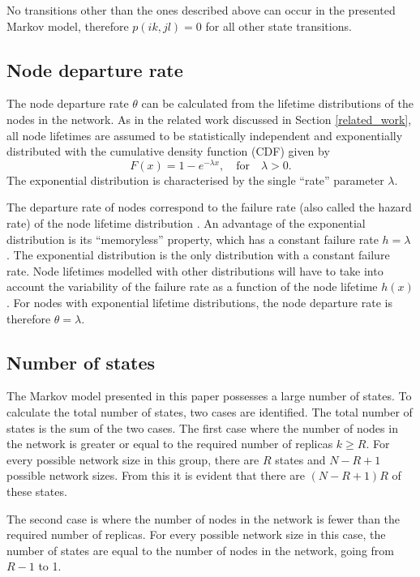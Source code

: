 \documentclass[10pt,a4paper,conference]{IEEEtran}
\begin{document}
No transitions other than the ones described above can occur in the presented Markov model, therefore $p(i k,j l) = 0$ for all other state transitions.

\subsection{Node departure rate}

The node departure rate $\theta$ can be calculated from the lifetime distributions of the nodes in the network. As in the related work discussed in Section \ref{related_work}, all node lifetimes are assumed to be statistically independent and exponentially distributed with the cumulative density function (CDF) given by
%
\begin{equation} \label{exp_dist}
    F(x) = 1 - e^{-\lambda x},\quad\textrm{for}\quad \lambda > 0.
\end{equation}
%
The exponential distribution is characterised by the single ``rate'' parameter $\lambda$.

The departure rate of nodes correspond to the failure rate (also called the hazard rate) of the node lifetime distribution \cite{rausand2004systemreliability}. An advantage of the exponential distribution is its ``memoryless'' property, which has a constant failure rate $h = \lambda$ \cite{rausand2004systemreliability}. The exponential distribution is the only distribution with a constant failure rate. Node lifetimes modelled with other distributions will have to take into account the variability of the failure rate as a function of the node lifetime $h(x)$. For nodes with exponential lifetime distributions, the node departure rate is therefore $\theta = \lambda$.

\subsection{Number of states}

The Markov model presented in this paper possesses a large number of states. To calculate the total number of states, two cases are identified. The total number of states is the sum of the two cases. The first case where the number of nodes in the network is greater or equal to the required number of replicas $k \geq R$. For every possible network size in this group, there are $R$ states and $N - R + 1$ possible network sizes. From this it is evident that there are $(N - R + 1)R$ of these states.

The second case is where the number of nodes in the network is fewer than the required number of replicas. For every possible network size in this case, the number of states are equal to the number of nodes in the network, going from $R-1$ to 1.
\end{document}
